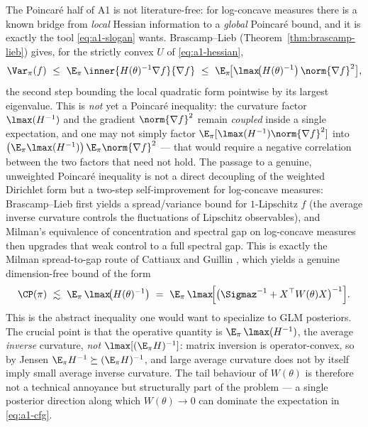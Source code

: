 \documentclass[../../main.tex]{subfiles}
\begin{document}
The Poincar\'e half of A1 is not literature-free: for log-concave measures there is a known
bridge from \emph{local} Hessian information to a \emph{global} Poincar\'e bound, and it is
exactly the tool \eqref{eq:a1-slogan} wants. Brascamp--Lieb (Theorem~\ref{thm:brascamp-lieb})
gives, for the strictly convex $U$ of \eqref{eq:a1-hessian},
\begin{equation}\label{eq:a1-bl}
  \Var_\pi(f)\ \le\ \E_\pi\,\inner{H(\theta)^{-1}\nabla f}{\nabla f}
  \ \le\ \E_\pi\!\big[\lmax\!\big(H(\theta)^{-1}\big)\,\norm{\nabla f}^2\big] ,
\end{equation}
the second step bounding the local quadratic form pointwise by its largest eigenvalue. This is
\emph{not} yet a Poincar\'e inequality: the curvature factor $\lmax(H^{-1})$ and the gradient
$\norm{\nabla f}^2$ remain \emph{coupled} inside a single expectation, and one may not simply
factor $\E_\pi[\lmax(H^{-1})\norm{\nabla f}^2]$ into
$\big(\E_\pi\lmax(H^{-1})\big)\,\E_\pi\norm{\nabla f}^2$ --- that would require a negative
correlation between the two factors that need not hold. The passage to a genuine, unweighted
Poincar\'e inequality is not a direct decoupling of the weighted Dirichlet form but a two-step
self-improvement for log-concave measures: Brascamp--Lieb first yields a spread/variance bound
for $1$-Lipschitz $f$ (the average inverse curvature controls the fluctuations of Lipschitz
observables), and Milman's equivalence of concentration and spectral gap on log-concave measures
then upgrades that weak control to a full spectral gap. This is exactly the
Milman spread-to-gap route of Cattiaux and Guillin
\cite{cattiaux2018poincare}, which yields a genuine dimension-free bound of the form
\begin{equation}\label{eq:a1-cfg}
  \CP(\pi)\ \lesssim\ \E_\pi\,\lmax\!\big(H(\theta)^{-1}\big)
  \ =\ \E_\pi\,\lmax\!\Big[\big(\Sigmaz^{-1}+X^\top W(\theta)X\big)^{-1}\Big].
\end{equation}
This is the abstract inequality one would want to specialize to GLM posteriors. The crucial point
is that the operative quantity is $\E_\pi\,\lmax(H^{-1})$, the average \emph{inverse} curvature,
\emph{not} $\lmax[(\E_\pi H)^{-1}]$: matrix inversion is operator-convex, so by Jensen
$\E_\pi H^{-1}\succeq(\E_\pi H)^{-1}$, and large average curvature does not by itself imply small
average inverse curvature. The tail behaviour of $W(\theta)$ is therefore not a technical
annoyance but structurally part of the problem --- a single posterior direction along which
$W(\theta)\to0$ can dominate the expectation in \eqref{eq:a1-cfg}.
\end{document}
